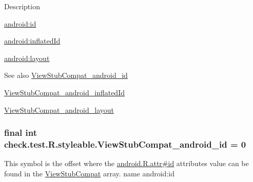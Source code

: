Description 

{\ttfamily \hyperlink{classcheck_1_1test_1_1_r_1_1styleable_af549e8eb71e8bfcf674efa7c9f7cd251}{android\+:id}}

{\ttfamily \hyperlink{classcheck_1_1test_1_1_r_1_1styleable_a7c6502320542baa7a355bd6d9665ff5f}{android\+:inflated\+Id}}

{\ttfamily \hyperlink{classcheck_1_1test_1_1_r_1_1styleable_ad1bcaf475dc40c26f77157642598f49c}{android\+:layout}}

\begin{DoxySeeAlso}{See also}
\hyperlink{classcheck_1_1test_1_1_r_1_1styleable_af549e8eb71e8bfcf674efa7c9f7cd251}{View\+Stub\+Compat\+\_\+android\+\_\+id} 

\hyperlink{classcheck_1_1test_1_1_r_1_1styleable_a7c6502320542baa7a355bd6d9665ff5f}{View\+Stub\+Compat\+\_\+android\+\_\+inflated\+Id} 

\hyperlink{classcheck_1_1test_1_1_r_1_1styleable_ad1bcaf475dc40c26f77157642598f49c}{View\+Stub\+Compat\+\_\+android\+\_\+layout} 
\end{DoxySeeAlso}
\hypertarget{classcheck_1_1test_1_1_r_1_1styleable_af549e8eb71e8bfcf674efa7c9f7cd251}{}
\subsubsection[{View\+Stub\+Compat\+\_\+android\+\_\+id}]{\setlength{\rightskip}{0pt plus 5cm}final int check.\+test.\+R.\+styleable.\+View\+Stub\+Compat\+\_\+android\+\_\+id = 0\hspace{0.3cm}{\ttfamily [static]}}\label{classcheck_1_1test_1_1_r_1_1styleable_af549e8eb71e8bfcf674efa7c9f7cd251}
This symbol is the offset where the \hyperlink{}{android.\+R.\+attr\#id} attribute\textquotesingle{}s value can be found in the \hyperlink{classcheck_1_1test_1_1_r_1_1styleable_adf691a9cd72c9028688f92bcb9b1c303}{View\+Stub\+Compat} array.  name android\+:id \hypertarget{classcheck_1_1test_1_1_r_1_1styleable_a7c6502320542baa7a355bd6d9665ff5f}{}

